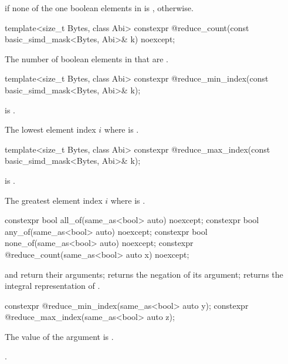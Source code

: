 \begin{itemdescr}
  \pnum\returns
   if none of the one boolean elements in  is , 
  otherwise.
\end{itemdescr}

\begin{itemdecl}
template<size_t Bytes, class Abi>
  constexpr @\simdsizetype@ reduce_count(const basic_simd_mask<Bytes, Abi>& k) noexcept;
\end{itemdecl}

\begin{itemdescr}
  \pnum\returns
  The number of boolean elements in  that are .
\end{itemdescr}

\begin{itemdecl}
template<size_t Bytes, class Abi>
  constexpr @\simdsizetype@ reduce_min_index(const basic_simd_mask<Bytes, Abi>& k);
\end{itemdecl}

\begin{itemdescr}
  \pnum\expects
   is .

  \pnum\returns
  The lowest element index $i$ where  is .
\end{itemdescr}

\begin{itemdecl}
template<size_t Bytes, class Abi>
  constexpr @\simdsizetype@ reduce_max_index(const basic_simd_mask<Bytes, Abi>& k);
\end{itemdecl}

\begin{itemdescr}
  \pnum\expects
   is .

  \pnum\returns
  The greatest element index $i$ where  is .
\end{itemdescr}

\begin{itemdecl}
constexpr bool all_of(same_as<bool> auto) noexcept;
constexpr bool any_of(same_as<bool> auto) noexcept;
constexpr bool none_of(same_as<bool> auto) noexcept;
constexpr @\simdsizetype@ reduce_count(same_as<bool> auto x) noexcept;
\end{itemdecl}

\begin{itemdescr}
  \pnum\returns
   and  return their arguments; 
  returns the negation of its argument;  returns the
  integral representation of .
\end{itemdescr}

\begin{itemdecl}
constexpr @\simdsizetype@ reduce_min_index(same_as<bool> auto y);
constexpr @\simdsizetype@ reduce_max_index(same_as<bool> auto z);
\end{itemdecl}

\begin{itemdescr}
  \pnum\expects
  The value of the argument is .

  \pnum\returns {}.
\end{itemdescr}

